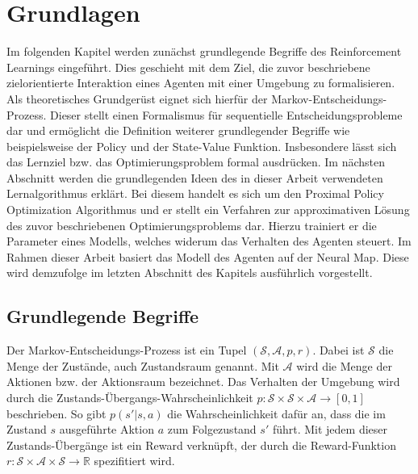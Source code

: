 \chapter{Grundlagen}

Im folgenden Kapitel werden zunächst grundlegende Begriffe des Reinforcement Learnings eingeführt. Dies geschieht mit dem Ziel, die zuvor beschriebene zielorientierte Interaktion eines Agenten mit einer Umgebung zu formalisieren. Als theoretisches Grundgerüst eignet sich hierfür der Markov-Entscheidungs-Prozess. Dieser stellt einen Formalismus für sequentielle Entscheidungsprobleme dar und ermöglicht die Definition weiterer grundlegender Begriffe wie beispielsweise der Policy und der State-Value Funktion. Insbesondere lässt sich das Lernziel bzw. das Optimierungsproblem formal ausdrücken. Im nächsten Abschnitt werden die grundlegenden Ideen des in dieser Arbeit verwendeten Lernalgorithmus erklärt. Bei diesem handelt es sich um den Proximal Policy Optimization Algorithmus und er stellt ein Verfahren zur approximativen Lösung des zuvor beschriebenen Optimierungsproblems dar. Hierzu trainiert er die Parameter eines Modells, welches widerum das Verhalten des Agenten steuert. Im Rahmen dieser Arbeit basiert das Modell des Agenten auf der Neural Map. Diese wird demzufolge im letzten Abschnitt des Kapitels ausführlich vorgestellt.


\section{Grundlegende Begriffe}

Der Markov-Entscheidungs-Prozess ist ein Tupel $(\mathcal{S, A}, p, r)$. Dabei ist $\mathcal{S}$ die Menge der Zustände, auch Zustandsraum genannt. Mit $\mathcal{A}$ wird die Menge der Aktionen bzw. der Aktionsraum bezeichnet. Das Verhalten der Umgebung wird durch die Zustands-Übergangs-Wahrscheinlichkeit $p: \mathcal{S} \times \mathcal{S} \times \mathcal{A} \to [0,1]$ beschrieben. So gibt $p(s'|s,a)$ die Wahrscheinlichkeit dafür an, dass die im Zustand $s$ ausgeführte Aktion $a$  zum Folgezustand $s'$ führt. Mit jedem dieser Zustands-Übergänge ist ein Reward verknüpft, der durch die Reward-Funktion $r: \mathcal{S} \times \mathcal{A} \times \mathcal{S} \to \mathbb{R}$ spezifitiert wird. \\

